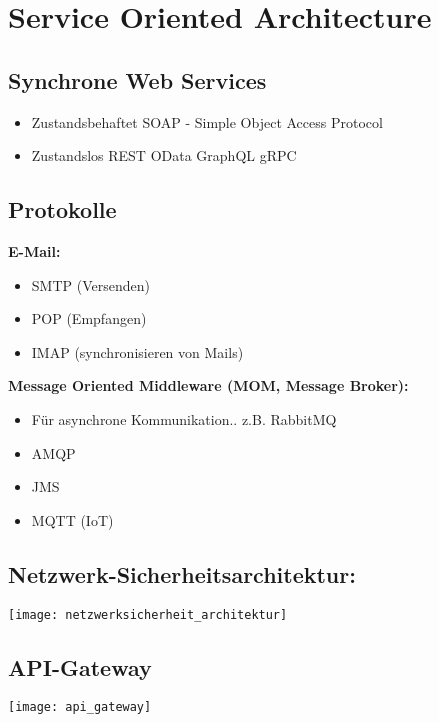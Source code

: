 

\section{Service Oriented Architecture}
\subsection{Synchrone Web Services}
\begin{itemize}[topsep=0pt, leftmargin=3mm]
    \setlength\itemsep{-0.3em}
    \item Zustandsbehaftet
    \SubItem SOAP - Simple Object Access Protocol
    \item Zustandslos
    \SubItem REST
    \SubItem OData
    \SubItem GraphQL
    \SubItem gRPC
\end{itemize}
\subsection{Protokolle}
\textbf{E-Mail:}
\begin{itemize}[topsep=0pt, leftmargin=3mm]
    \setlength\itemsep{-0.3em}
    \item SMTP (Versenden)
    \item POP (Empfangen)
    \item IMAP (synchronisieren von Mails)
\end{itemize}
\textbf{Message Oriented Middleware (MOM, Message Broker):}
\begin{itemize}[topsep=0pt, leftmargin=3mm]
    \setlength\itemsep{-0.3em}
    \item Für asynchrone Kommunikation.. z.B. RabbitMQ
    \item AMQP
    \item JMS
    \item MQTT (IoT)
\end{itemize}
\subsection{Netzwerk-Sicherheitsarchitektur:}
\texttt{[image: netzwerksicherheit\_architektur]}
\subsection{API-Gateway}
\texttt{[image: api\_gateway]}